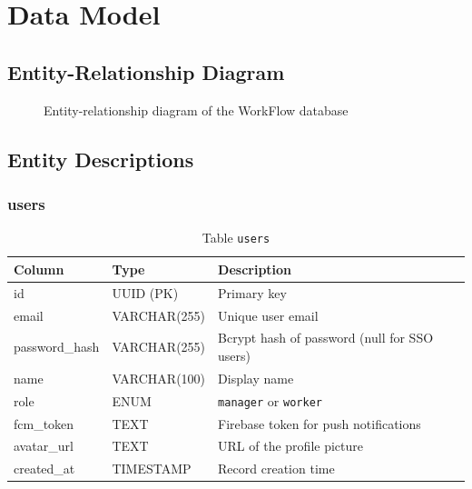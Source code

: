 \chapter{Data Model}

\section{Entity-Relationship Diagram}

\begin{figure}[H]
  \centering
  \caption{Entity-relationship diagram of the WorkFlow database}
\end{figure}

\section{Entity Descriptions}

\subsection{users}
\begin{table}[H]
  \centering
  \begin{tabularx}{\textwidth}{llX}
    \toprule
    \textbf{Column} & \textbf{Type} & \textbf{Description} \\
    \midrule
    id            & UUID (PK)     & Primary key \\
    email         & VARCHAR(255)  & Unique user email \\
    password\_hash & VARCHAR(255) & Bcrypt hash of password (null for SSO users) \\
    name          & VARCHAR(100)  & Display name \\
    role          & ENUM          & \texttt{manager} or \texttt{worker} \\
    fcm\_token    & TEXT          & Firebase token for push notifications \\
    avatar\_url   & TEXT          & URL of the profile picture \\
    created\_at   & TIMESTAMP     & Record creation time \\
    \bottomrule
  \end{tabularx}
  \caption{Table \texttt{users}}
\end{table}

